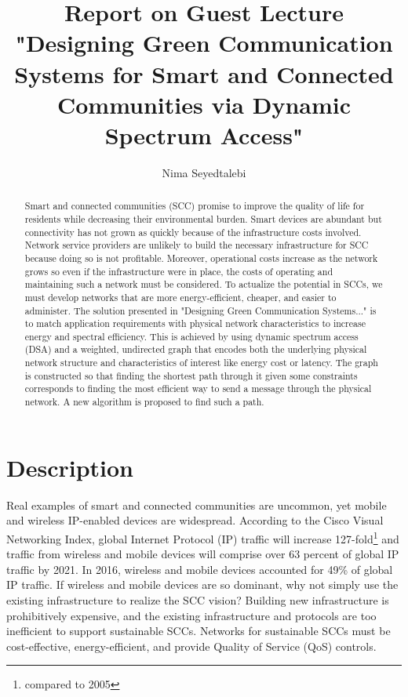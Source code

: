 \documentclass[]{article}
\title{Report on Guest Lecture "Designing Green Communication Systems for Smart and Connected Communities via Dynamic Spectrum Access"}
\author{Nima Seyedtalebi}
\begin{document}
\maketitle

\begin{abstract}
Smart and connected communities (SCC) promise to improve the quality of life for residents while decreasing their environmental burden. Smart devices are abundant  but connectivity has not grown as quickly because of the infrastructure costs involved. Network service providers are unlikely to build the necessary infrastructure for SCC because doing so is not profitable. Moreover, operational costs increase as the network grows so even if the infrastructure were in place, the costs of operating and maintaining such a network must be considered. To actualize the potential in SCCs, we must develop networks that are more energy-efficient, cheaper, and easier to administer. The solution presented in "Designing Green Communication Systems..." is to match application requirements with physical network characteristics to increase energy and spectral efficiency. This is achieved by using dynamic spectrum access (DSA) and a weighted, undirected graph that encodes both the underlying physical network structure and characteristics of interest like energy cost or latency. The graph is constructed so that finding the shortest path through it given some constraints corresponds to finding the most efficient way to send a message through the physical network. A new algorithm is proposed to find such a path.
\end{abstract}

\section{Description}
Real examples of smart and connected communities are uncommon, yet mobile and wireless IP-enabled devices are widespread. According to the Cisco Visual Networking Index, global Internet Protocol (IP) traffic will increase 127-fold\footnote{compared to 2005} and traffic from wireless and mobile devices will comprise over 63 percent of global IP traffic by 2021. In 2016, wireless and mobile devices accounted for 49\% of global IP traffic.\cite{cisco} If wireless and mobile devices are so dominant, why not simply use the existing infrastructure to realize the SCC vision? Building new infrastructure is prohibitively expensive, and the existing infrastructure and protocols are too inefficient to support sustainable SCCs. Networks for sustainable SCCs must be cost-effective, energy-efficient, and provide Quality of Service (QoS) controls.\cite{shah}
\end{document}
